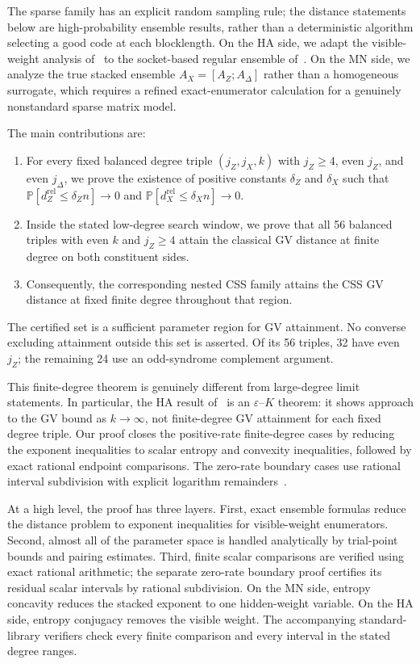 \documentclass[11pt]{article}
\theoremstyle{definition}
\newcommand{\PP}{\mathbb P}
\begin{document}
The sparse family has an explicit random sampling rule; the distance statements below are high-probability ensemble results, rather than a deterministic algorithm selecting a good code at each blocklength. On the HA side, we adapt the visible-weight analysis of~\cite{HA05} to the socket-based regular ensemble of~\cite[Secs.~3.3--3.4]{RU08}. On the MN side, we analyze the true stacked ensemble \(A_X=[A_Z;A_\Delta]\) rather than a homogeneous surrogate, which requires a refined exact-enumerator calculation for a genuinely nonstandard sparse matrix model.

The main contributions are:
\begin{enumerate}
\item For every fixed balanced degree triple \((j_Z,j_X,k)\) with \(j_Z\ge4\), even \(j_Z\), and even \(j_\Delta\), we prove the existence of positive constants \(\delta_Z\) and \(\delta_X\) such that \(\PP[d_Z^{\mathrm{rel}}\le \delta_Z n]\to 0\) and \(\PP[d_X^{\mathrm{rel}}\le \delta_X n]\to 0\).
\item Inside the stated low-degree search window, we prove that all 56 balanced triples with even \(k\) and \(j_Z\ge4\) attain the classical GV distance at finite degree on both constituent sides.
\item Consequently, the corresponding nested CSS family attains the CSS GV distance at fixed finite degree throughout that region.
\end{enumerate}

The certified set is a sufficient parameter region for GV attainment. No converse excluding attainment outside this set is asserted. Of its 56 triples, 32 have even \(j_Z\); the remaining 24 use an odd-syndrome complement argument.

This finite-degree theorem is genuinely different from large-degree limit statements. In particular, the HA result of~\cite{HA05} is an \(\varepsilon\)--\(K\) theorem: it shows approach to the GV bound as \(k\to\infty\), not finite-degree GV attainment for each fixed degree triple. Our proof closes the positive-rate finite-degree cases by reducing the exponent inequalities to scalar entropy and convexity inequalities, followed by exact rational endpoint comparisons. The zero-rate boundary cases use rational interval subdivision with explicit logarithm remainders~\cite{MKC09,Tucker11}.

At a high level, the proof has three layers. First, exact ensemble formulas reduce the distance problem to exponent inequalities for visible-weight enumerators. Second, almost all of the parameter space is handled analytically by trial-point bounds and pairing estimates. Third, finite scalar comparisons are verified using exact rational arithmetic; the separate zero-rate boundary proof certifies its residual scalar intervals by rational subdivision. On the MN side, entropy concavity reduces the stacked exponent to one hidden-weight variable. On the HA side, entropy conjugacy removes the visible weight. The accompanying standard-library verifiers check every finite comparison and every interval in the stated degree ranges.
\end{document}
